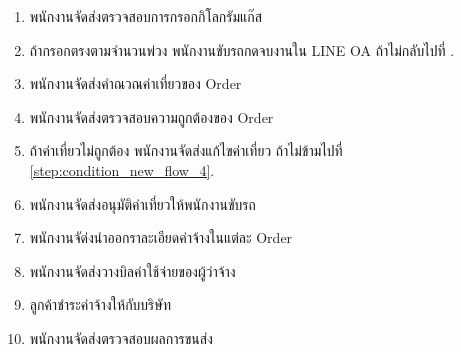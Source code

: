\begin{enumerate}
    \item พนักงานจัดส่งตรวจสอบการกรอกกิโลกรัมแก๊ส
    \item ถ้ากรอกตรงตามจำนวนพ่วง พนักงานขับรถกดจบงานใน LINE OA ถ้าไม่กลับไปที่ \label{step:condition_new_flow_4}.
    \item พนักงานจัดส่งคำณวณค่าเที่ยวของ Order
    \item พนักงานจัดส่งตรวจสอบความถูกต้องของ Order
    \item ถ้าค่าเที่ยวไม่ถูกต้อง พนักงานจัดส่งแก้ไขค่าเที่ยว ถ้าไม่ข้ามไปที่ \ref{step:condition_new_flow_4}.
    \item พนักงานจัดส่งอนุมัติค่าเที่ยวให้พนักงานขับรถ \cite{step:condition_new_flow_4}
    \item พนักงานจัด่งนำออกราละเอียดค่าจ้างในแต่ละ Order
    \item พนักงานจัดส่งวางบิลค่าใช้จ่ายของผู้ว่าจ้าง
    \item ลูกค้าชำระค่าจ้างให้กับบริษัท
    \item พนักงานจัดส่งตรวจสอบผลการขนส่ง
\end{enumerate}
